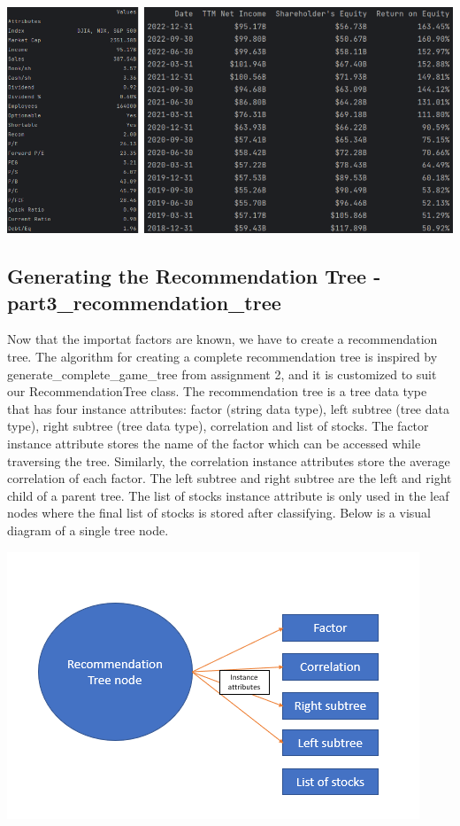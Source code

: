 \documentclass[fontsize=11pt]{article}
\begin{document}
\begin{center}
\includegraphics[scale=0.5]{dataset.png}
\end{center}

\subsection{Generating the Recommendation Tree - part3\_recommendation\_tree}
Now that the importat factors are known, we have to create a recommendation tree. The algorithm for creating a complete recommendation tree is inspired by generate\_complete\_game\_tree from assignment 2, and it is customized to suit our RecommendationTree class. The recommendation tree is a tree data type that has four instance attributes: factor (string data type), left subtree (tree data type), right subtree (tree data type), correlation and list of stocks. The factor instance attribute stores the name of the factor which can be accessed while traversing the tree. Similarly, the correlation instance attributes store the average correlation of each factor. The left subtree and right subtree are the left and right child of a parent tree. The list of stocks instance attribute is only used in the leaf nodes where the final list of stocks is stored after classifying. Below is a visual diagram of a single tree node.\\

\begin{center}
\includegraphics{tree_node.png}
\end{center}
\end{document}
